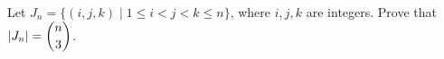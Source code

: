 Let $J_n=\{(i,j,k)\mid 1\le i<j<k\le n\}$, where $i,j,k$ are integers. Prove that $|J_n|=\dbinom n3$.
